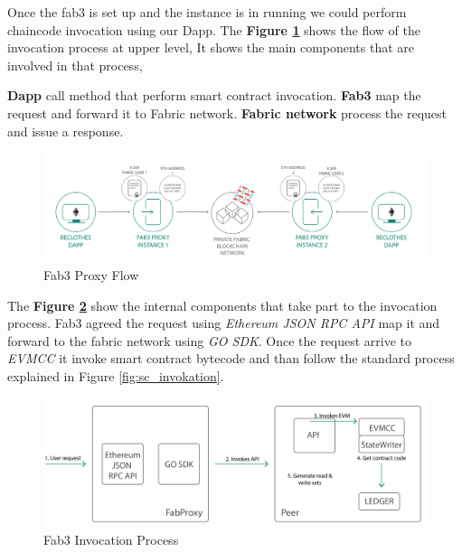 Once the fab3 is set up and the instance is in running we could perform chaincode invocation using 
our Dapp. The \textbf{Figure \ref{fig:fab3_flow}} shows the flow of the invocation process at upper level,
It shows the main components that are involved in that process, 

\begin{outline}[enumerate]
    \1 \textbf{Dapp} call method that perform smart contract invocation.
    \1 \textbf{Fab3} map the request and forward it to Fabric network.
    \1 \textbf{Fabric network} process the request and issue a response.
\end{outline}

\begin{figure}[h!]
    \centering
    \includegraphics[totalheight=5cm]{img/fab3_flow.png}
    \caption{Fab3 Proxy Flow}
    \label{fig:fab3_flow}
\end{figure}

The \textbf{Figure \ref{fig:fab3_invokation}} show the internal components that take part to the invocation
process. Fab3 agreed the request using \textit{Ethereum JSON RPC API} map it and forward to the fabric
network using \textit{GO SDK}. Once the request arrive to \textit{EVMCC} it invoke smart contract bytecode
and than follow the standard process explained in Figure \ref{fig:sc_invokation}.

\begin{figure}[h!]
    \centering
    \includegraphics[totalheight=5cm]{img/fab3_invokation.png}
    \caption{Fab3 Invocation Process}
    \label{fig:fab3_invokation}
\end{figure}


\newpage
